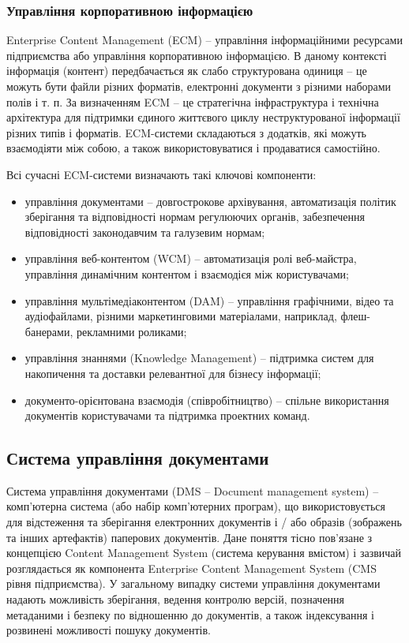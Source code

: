 \subsubsection{Управління корпоративною інформацією}
Enterprise Content Management (ECM) -- управління інформаційними ресурсами підприємства або управління корпоративною інформацією.
В даному контексті інформація (контент) передбачається як слабо структурована одиниця -- це можуть бути файли різних форматів, електронні документи з різними наборами полів і т. п.
За визначенням ECM -- це стратегічна інфраструктура і технічна архітектура для підтримки єдиного життєвого циклу неструктурованої інформації різних типів і форматів. 
ECM-системи складаються з додатків, які можуть взаємодіяти між собою, а також використовуватися і продаватися самостійно. 
\par Всі сучасні ECM-системи визначають такі ключові компоненти:
\begin{itemize}
\item управління документами -- довгострокове архівування, автоматизація політик зберігання та відповідності нормам регулюючих органів, забезпечення відповідності законодавчим та галузевим нормам;
\item управління веб-контентом (WCM) -- автоматизація ролі веб-майстра, управління динамічним контентом і взаємодієя між користувачами;
\item  управління мультімедіаконтентом (DAM) -- управління графічними, відео та аудіофайлами, різними маркетинговими матеріалами, наприклад, флеш-банерами, рекламними роликами;
\item управління знаннями (Knowledge Management) -- підтримка систем для накопичення та доставки релевантної для бізнесу інформації;
\item документо-орієнтована взаємодія (співробітництво) -- спільне використання документів користувачами та підтримка проектних команд.
\end{itemize}

\subsection{Система управління документами}
Система управління документами (DMS -- Document management system) -- комп'ютерна система (або набір комп'ютерних програм), що використовується для відстеження та зберігання електронних документів і / або образів (зображень та інших артефактів) паперових документів.
Дане поняття тісно пов'язане з концепцією Content Management System (система керування вмістом) і зазвичай розглядається як компонента Enterprise Content Management System (CMS рівня підприємства).
У загальному випадку системи управління документами надають можливість зберігання, ведення контролю версій, позначення метаданими і безпеку по відношенню до документів, а також індексування і розвинені можливості пошуку документів.

